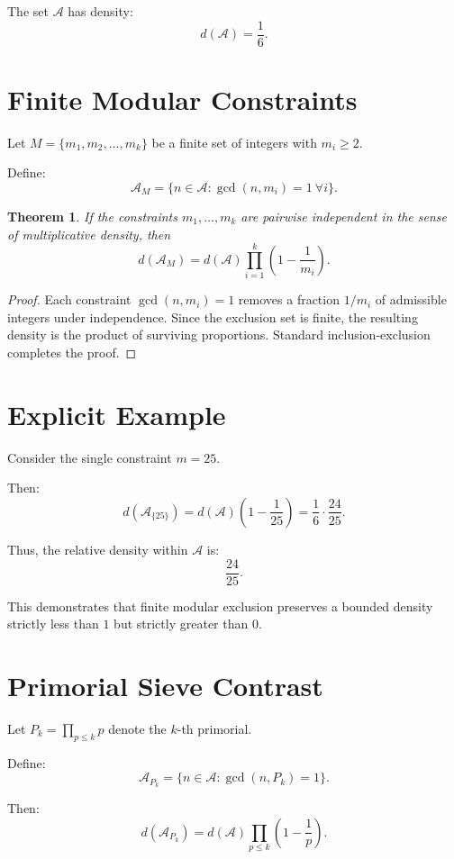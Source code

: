\documentclass[11pt]{article}
\theoremstyle{plain}
\newtheorem{theorem}{Theorem}
\begin{document}
The set $\mathcal{A}$ has density:
\[
d(\mathcal{A}) = \frac{1}{6}.
\]

\section{Finite Modular Constraints}

Let $M = \{ m_1, m_2, \dots, m_k \}$ be a finite set of integers with $m_i \geq 2$.

Define:
\[
\mathcal{A}_M = \{ n \in \mathcal{A} : \gcd(n, m_i) = 1 \ \forall i \}.
\]

\begin{theorem}
If the constraints $m_1, \dots, m_k$ are pairwise independent in the sense of multiplicative density, then
\[
d(\mathcal{A}_M) = d(\mathcal{A}) \prod_{i=1}^k \left(1 - \frac{1}{m_i}\right).
\]
\end{theorem}

\begin{proof}
Each constraint $\gcd(n, m_i) = 1$ removes a fraction $1/m_i$ of admissible integers under independence. Since the exclusion set is finite, the resulting density is the product of surviving proportions. Standard inclusion-exclusion completes the proof.
\end{proof}

\section{Explicit Example}

Consider the single constraint $m = 25$.

Then:
\[
d(\mathcal{A}_{\{25\}}) = d(\mathcal{A}) \left(1 - \frac{1}{25}\right) = \frac{1}{6} \cdot \frac{24}{25}.
\]

Thus, the relative density within $\mathcal{A}$ is:
\[
\frac{24}{25}.
\]

This demonstrates that finite modular exclusion preserves a bounded density strictly less than $1$ but strictly greater than $0$.

\section{Primorial Sieve Contrast}

Let $P_k = \prod_{p \leq k} p$ denote the $k$-th primorial.

Define:
\[
\mathcal{A}_{P_k} = \{ n \in \mathcal{A} : \gcd(n, P_k) = 1 \}.
\]

Then:
\[
d(\mathcal{A}_{P_k}) = d(\mathcal{A}) \prod_{p \leq k} \left(1 - \frac{1}{p}\right).
\]
\end{document}
